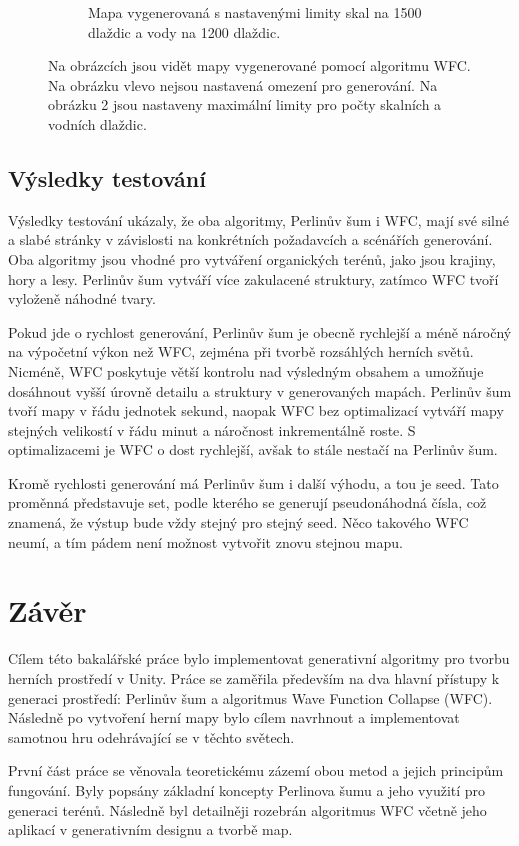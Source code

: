 \begin{figure}[H]
\begin{subfigure}{0.475\textwidth}
		\caption{Mapa vygenerovaná s nastavenými limity skal na 1500 dlaždic a vody na 1200 dlaždic.}
		\label{WFCRestricted}
	\end{subfigure}
	\caption{Na obrázcích jsou vidět mapy vygenerované pomocí algoritmu WFC. Na obrázku vlevo nejsou nastavená omezení pro generování. Na obrázku 2 jsou nastaveny maximální limity pro počty skalních a vodních dlaždic.}
	\label{WFCRestrictions}
\end{figure}

\section{Výsledky testování}
Výsledky testování ukázaly, že oba algoritmy, Perlinův šum i WFC, mají své silné a slabé stránky v závislosti na konkrétních požadavcích a scénářích generování. Oba algoritmy jsou vhodné pro vytváření organických terénů, jako jsou krajiny, hory a lesy. Perlinův šum vytváří více zakulacené struktury, zatímco WFC tvoří vyloženě náhodné tvary.

Pokud jde o rychlost generování, Perlinův šum je obecně rychlejší a méně náročný na výpočetní výkon než WFC, zejména při tvorbě rozsáhlých herních světů. Nicméně, WFC poskytuje větší kontrolu nad výsledným obsahem a umožňuje dosáhnout vyšší úrovně detailu a struktury v generovaných mapách. Perlinův šum tvoří mapy v řádu jednotek sekund, naopak WFC bez optimalizací vytváří mapy stejných velikostí v řádu minut a náročnost inkrementálně roste. S optimalizacemi je WFC o dost rychlejší, avšak to stále nestačí na Perlinův šum.

Kromě rychlosti generování má Perlinův šum i další výhodu, a tou je seed. Tato proměnná představuje set, podle kterého se generují pseudonáhodná čísla, což znamená, že výstup bude vždy stejný pro stejný seed. Něco takového WFC neumí, a tím pádem není možnost vytvořit znovu stejnou mapu.

\chapter{Závěr}
Cílem této bakalářské práce bylo implementovat generativní algoritmy pro tvorbu herních prostředí v Unity. Práce se zaměřila především na dva hlavní přístupy k generaci prostředí: Perlinův šum a algoritmus Wave Function Collapse (WFC). Následně po vytvoření herní mapy bylo cílem navrhnout a implementovat samotnou hru odehrávající se v těchto světech.

První část práce se věnovala teoretickému zázemí obou metod a jejich principům fungování. Byly popsány základní koncepty Perlinova šumu a jeho využití pro generaci terénů. Následně byl detailněji rozebrán algoritmus WFC včetně jeho aplikací v generativním designu a tvorbě map.

